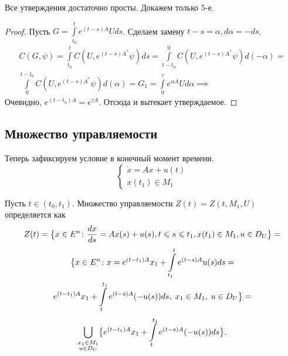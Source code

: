Все утверждения достаточно просты.
Докажем только 5-е.

\begin{proof}
    Пусть $G = \displaystyle \int\limits_{t_0}^{t} e^{(t - s)A} U ds$.
    Сделаем замену $t - s = \alpha, d\alpha = -ds$.
    \begin{gather*}
        C(G, \psi) = \int\limits_{t_0}^{t} C(U, e^{(t - s)A^*} \psi) ds =
        \int\limits_{t - t_0}^{0} C(U, e^{(t - s)A^*} \psi) d(-\alpha) = \\
        \int\limits_{0}^{t - t_0} C(U, e^{(t - s)A^*} \psi) d(\alpha) = 
        G_1 = \int\limits_{0}^{\tau} e^{\alpha A} U d\alpha \implies 
    \end{gather*}
    Очевидно, $e^{(t - t_0)A} = e^{\tau A}$.
    Отсюда и вытекает утверждаемое.
\end{proof}

\subsection{Множество управляемости}
Теперь зафиксируем условие в конечный момент времени.
\begin{equation*}
    \begin{cases}
        \dot{x} = Ax + u(t) \\
        x(t_1) \in M_1
    \end{cases}
\end{equation*}

\begin{defn}
    Пусть $t \in (t_0, t_1)$.
    Множество управляемости $Z(t) = Z(t, M_1, U)$ определяется как
    \begin{equation*}
        Z(t) = \bigl\{ x \in E^n\colon \frac{dx}{ds} = Ax(s) + u(s), t \leqslant s \leqslant t_1, x(t_1) \in M_1, u \in D_U \bigr\} =
    \end{equation*}
    \begin{multline*}
        \bigl\{ x \in E^n \colon x = e^{(t - t_1)A} x_1 + \int\limits_{t_1}^{t} e^{(t - s)A} u(s) ds = \\
        e^{(t - t_1)A} x_1 + \int\limits_{t}^{t_1} e^{(t - s)A} (-u(s)) ds, \; x_1 \in M_1, \; u \in D_U \bigr\} =
    \end{multline*}
    \begin{equation*}
        \bigcup_{\substack{x_1 \in M_1 \\ u \in D_U}} \bigl\{ e^{(t - t_1)A} x_1 + \int\limits_{t}^{t_1} e^{(t - s)A} (-u(s)) ds \bigr\}.
    \end{equation*}
\end{defn}


